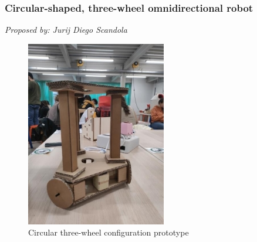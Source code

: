 \subsubsection{Circular-shaped, three-wheel omnidirectional robot}
\textit{Proposed by: Jurij Diego Scandola}

\begin{figure}[H]
    \centering
    \includegraphics[width=0.6\linewidth]{../ReportMovementModule/images/Aspose.Words.728084da-df58-4b9d-a372-f65cffbdb23d.005.jpeg}
    \caption{Circular three-wheel configuration prototype}
\end{figure}
